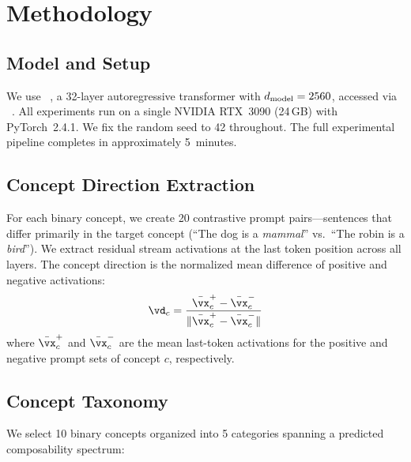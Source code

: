 \section{Methodology}
\label{sec:method}

\subsection{Model and Setup}

We use \pythia~\citep{biderman2023pythia}, a 32-layer autoregressive
transformer with $d_{\text{model}} = 2560$, accessed via
\transformerlens~\citep{nanda2022transformerlens}. All experiments run on a
single NVIDIA RTX~3090 (24\,GB) with PyTorch~2.4.1. We fix the random seed to
42 throughout. The full experimental pipeline completes in approximately
5~minutes.

\subsection{Concept Direction Extraction}

For each binary concept, we create 20 contrastive prompt pairs---sentences that
differ primarily in the target concept (\eg ``The dog is a \emph{mammal}'' vs.\
``The robin is a \emph{bird}''). We extract residual stream activations at the
last token position across all layers. The concept direction is the normalized
mean difference of positive and negative activations:
\begin{equation}
    \vd_c = \frac{\bar{\vx}^{+}_c - \bar{\vx}^{-}_c}
                 {\|\bar{\vx}^{+}_c - \bar{\vx}^{-}_c\|}
    \label{eq:direction}
\end{equation}
where $\bar{\vx}^{+}_c$ and $\bar{\vx}^{-}_c$ are the mean last-token
activations for the positive and negative prompt sets of concept $c$,
respectively.

\subsection{Concept Taxonomy}

We select 10 binary concepts organized into 5 categories spanning a predicted
composability spectrum:

